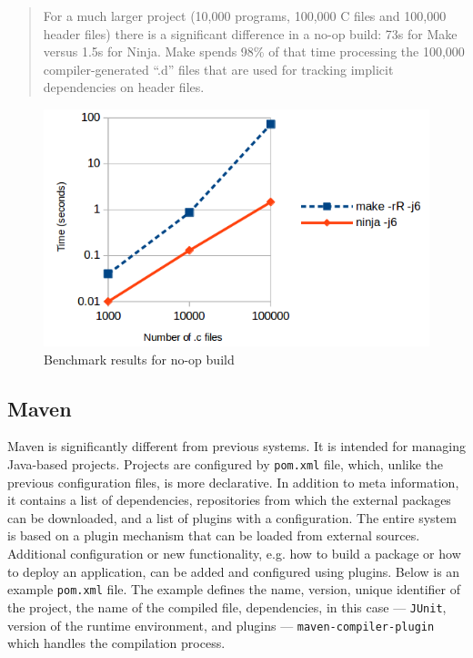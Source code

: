 \begin{quote}
For a much larger project (10,000 programs, 100,000 C files and 100,000
header files) there is a significant difference in a no-op build: 73s
for Make versus 1.5s for Ninja. Make spends 98\% of that time processing
the 100,000 compiler-generated ``.d'' files that are used for tracking
implicit dependencies on header files.
\end{quote}

\begin{figure}
\centering
\includegraphics[scale=0.45]{./no-op-build.png}
\caption{Benchmark results for no-op build \cite{BENCHMARK}}
\end{figure}

\hypertarget{maven}{%
\subsection{Maven}\label{maven}}

Maven is significantly different from previous systems. It is intended
for managing Java-based projects. Projects are configured by \texttt{pom.xml}
file, which, unlike the previous configuration files, is more
declarative. In addition to meta information, it contains a list of
dependencies, repositories from which the external packages can be
downloaded, and a list of plugins with a configuration. The entire system
is based on a plugin mechanism that can be loaded from external
sources. Additional configuration or new functionality, e.g. how to
build a package or how to deploy an application, can be added and
configured using plugins. Below is an example \texttt{pom.xml} file.
The example defines the name, version, unique identifier of the project,
the name of the compiled file, dependencies, in this case --- \texttt{JUnit},
version of the runtime environment, and plugins --- \texttt{maven-compiler-plugin}
which handles the compilation process.

